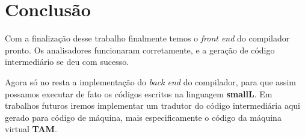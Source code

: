 \section{Conclusão}

Com a finalização desse trabalho finalmente temos o \textit{front end} do compilador pronto. Os analisadores funcionaram corretamente, e a geração de código intermediário se deu com sucesso.

Agora só no resta a implementação do \textit{back end} do compilador, para que assim possamos executar de fato os códigos escritos na linguagem \textbf{smallL}. Em trabalhos futuros iremos implementar um tradutor do código intermediária aqui gerado para código de máquina, mais especificamente o código da máquina virtual \textbf{TAM}.